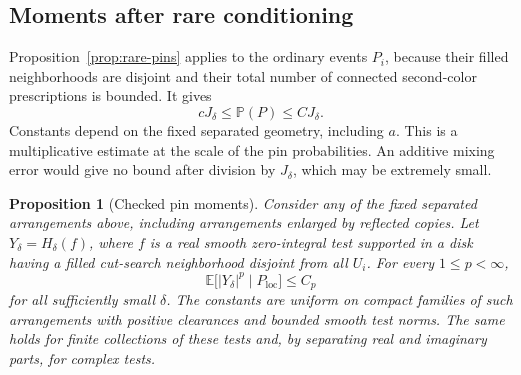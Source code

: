 \documentclass[11pt]{article}
\newtheorem{proposition}[theorem]{Proposition}
\theoremstyle{definition}
\theoremstyle{remark}
\numberwithin{equation}{section}
\begin{document}
\subsection{Moments after rare conditioning}

Proposition~\ref{prop:rare-pins} applies to the ordinary events $P_i$,
because their filled neighborhoods are disjoint and their total number
of connected second-color prescriptions is bounded.  It gives
\begin{equation}\label{pins:multiplicative}
 c J_\delta\le\mathbb P(P)\le C J_\delta.
\end{equation}
Constants depend on the fixed separated geometry, including $a$.
This is a multiplicative estimate at the scale of the pin probabilities.
An additive mixing error would give no bound after division by
$J_\delta$, which may be extremely small.

\begin{proposition}[Checked pin moments]\label{prop:pin-moments}
Consider any of the fixed separated arrangements above, including
arrangements enlarged by reflected copies.  Let $Y_\delta=H_\delta(f)$,
where $f$ is a real smooth zero-integral test supported in a disk having a
filled cut-search neighborhood disjoint from all $U_i$.  For every
$1\le p<\infty$,
\begin{equation}\label{eq:pin-moments}
 \mathbb E\bigl[|Y_\delta|^p\mid P_{\mathrm{loc}}\bigr]\le C_p
\end{equation}
for all sufficiently small $\delta$.  The constants are uniform on
compact families of such arrangements with positive clearances and
bounded smooth test norms.  The same holds for finite collections of
these tests and, by separating real and imaginary parts, for complex
tests.
\end{proposition}
\end{document}
